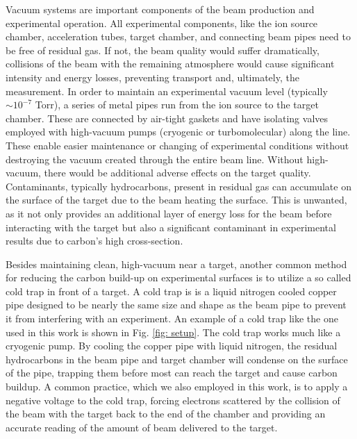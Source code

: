 Vacuum systems are important components of the beam production and experimental operation. All experimental components, like the ion source chamber, acceleration tubes, target chamber, and connecting beam pipes need to be free of residual gas. If not, the beam quality would suffer dramatically, collisions of the beam with the remaining atmosphere would cause significant intensity and energy losses, preventing transport and, ultimately, the measurement. In order to maintain an experimental vacuum level (typically $\sim 10^{-7}$ Torr), a series of metal pipes run from the ion source to the target chamber. These are connected by air-tight gaskets and have isolating valves employed with high-vacuum pumps (cryogenic or turbomolecular) along the line. These enable easier maintenance or changing of experimental conditions without destroying the vacuum created through the entire beam line. Without high-vacuum, there would be additional adverse effects on the target quality. Contaminants, typically hydrocarbons, present in residual gas can accumulate on the surface of the target due to the beam heating the surface. This is unwanted, as it not only provides an additional layer of energy loss for the beam before interacting with the target but also a significant contaminant in experimental results due to carbon's high cross-section.

Besides maintaining clean, high-vacuum near a target, another common method for reducing the carbon build-up on experimental surfaces is to utilize a so called cold trap in front of a target. A cold trap is is a liquid nitrogen cooled copper pipe designed to be nearly the same size and shape as the beam pipe to prevent it from interfering with an experiment. An example of a cold trap like the one used in this work is shown in Fig. \ref{fig: setup}. The cold trap works much like a cryogenic pump. By cooling the copper pipe with liquid nitrogen, the residual hydrocarbons in the beam pipe and target chamber will condense on the surface of the pipe, trapping them before most can reach the target and cause carbon buildup. A common practice, which we also employed in this work, is to apply a negative voltage to the cold trap, forcing electrons scattered by the collision of the beam with the target back to the end of the chamber and providing an accurate reading of the amount of beam delivered to the target. 


